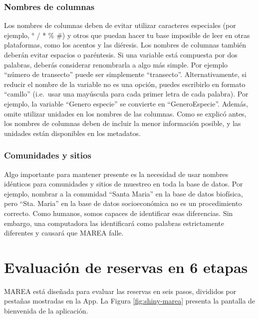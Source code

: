 \documentclass[]{krantz}
\begin{document}
\hypertarget{nombres-de-columnas}{%
\subsubsection{Nombres de columnas}\label{nombres-de-columnas}}

Los nombres de columnas deben de evitar utilizar caracteres especiales (por ejemplo, ° / * \% \#) y otros que puedan hacer tu base imposible de leer en otras plataformas, como los acentos y las diéresis. Los nombres de columnas también deberán evitar espacios o paréntesis. Si una variable está compuesta por dos palabras, deberás considerar renombrarla a algo más simple. Por ejemplo ``número de transecto'' puede ser simplemente ``transecto''. Alternativamente, si reducir el nombre de la variable no es una opción, puedes escribirlo en formato ``camllo'' (i.e.~usar una mayúscula para cada primer letra de cada palabra). Por ejemplo, la variable ``Genero especie'' se convierte en ``GeneroEspecie''. Además, omite utilizar unidades en los nombres de las columnas. Como se explicó antes, los nombres de columnas deben de incluir la menor información posible, y las unidades están disponibles en los metadatos.

\hypertarget{comunidades-y-sitios}{%
\subsubsection{Comunidades y sitios}\label{comunidades-y-sitios}}

Algo importante para mantener presente es la necesidad de usar nombres idénticos para comunidades y sitios de muestreo en toda la base de datos. Por ejemplo, nombrar a la comunidad ``Santa Maria'' en la base de datos biofísica, pero ``Sta. Maria'' en la base de datos socioeconómica no es un procedimiento correcto. Como humanos, somos capaces de identificar esas diferencias. Sin embargo, una computadora las identificará como palabras estrictamente diferentes y causará que MAREA falle.

\hypertarget{evaluacion-de-reservas-en-6-etapas}{%
\section{Evaluación de reservas en 6 etapas}\label{evaluacion-de-reservas-en-6-etapas}}

MAREA está diseñada para evaluar las reservas en seis pasos, divididos por pestañas mostradas en la App. La Figura \ref{fig:shiny-marea} presenta la pantalla de bienvenida de la aplicación.
\end{document}

